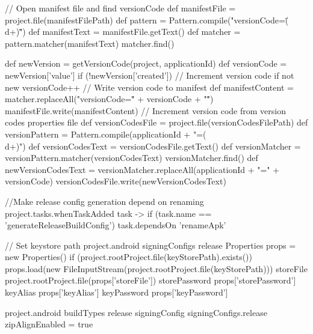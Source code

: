 \begin{gradlecode}[caption=Gradle Plugin to help publish APKs,label=lst:gradle_plugin_publish]
{{{            // Open manifest file and find versionCode
            def manifestFile = project.file(manifestFilePath)
            def pattern = Pattern.compile("versionCode=\"(\\d+)\"")
            def manifestText = manifestFile.getText()
            def matcher = pattern.matcher(manifestText)
            matcher.find()

            def newVersion = getVersionCode(project, applicationId)
            def versionCode = newVersion['value']
            if (!newVersion['created']) {
                // Increment version code if not new
                versionCode++
                // Write version code to manifest
                def manifestContent = matcher.replaceAll("versionCode=\"" + versionCode + "\"")
                manifestFile.write(manifestContent)
                // Increment version code from version codes properties file
                def versionCodesFile = project.file(versionCodesFilePath)
                def versionPattern = Pattern.compile(applicationId + "=(\\d+)")
                def versionCodesText = versionCodesFile.getText()
                def versionMatcher = versionPattern.matcher(versionCodesText)
                versionMatcher.find()
                def newVersionCodesText = versionMatcher.replaceAll(applicationId + "=" + versionCode)
                versionCodesFile.write(newVersionCodesText)
            }
        }

        //Make release config generation depend on renaming
        project.tasks.whenTaskAdded { task ->
            if (task.name == 'generateReleaseBuildConfig') {
                task.dependsOn 'renameApk'
            }
        }

        // Set keystore path
        project.android {
            signingConfigs {
                release {
                    Properties props = new Properties()
                    if (project.rootProject.file(keyStorePath).exists())
                    {
                        props.load(new FileInputStream(project.rootProject.file(keyStorePath)))
                        storeFile project.rootProject.file(props['storeFile'])
                        storePassword props['storePassword']
                        keyAlias props['keyAlias']
                        keyPassword props['keyPassword']
                    }
                }
            }
        }

        project.android {
            buildTypes {
                release {
                    signingConfig signingConfigs.release
                    zipAlignEnabled = true
                }
            }
        }

}}
\end{gradlecode}
